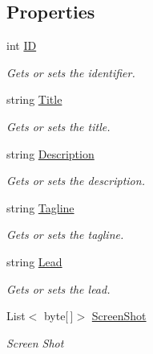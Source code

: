 \subsection*{Properties}
\begin{DoxyCompactItemize}
\item 
int \hyperlink{class_open_1_1_g_i_1_1hypermart_1_1_data_transformation_objects_1_1_product_d_t_o_ab965f0f2be3b04afb1de5e8fa97cd93a}{ID}
\begin{DoxyCompactList}\small\item\em Gets or sets the identifier. \end{DoxyCompactList}\item 
string \hyperlink{class_open_1_1_g_i_1_1hypermart_1_1_data_transformation_objects_1_1_product_d_t_o_a6f03b28697c295061d5c914d5598efef}{Title}
\begin{DoxyCompactList}\small\item\em Gets or sets the title. \end{DoxyCompactList}\item 
string \hyperlink{class_open_1_1_g_i_1_1hypermart_1_1_data_transformation_objects_1_1_product_d_t_o_a1de153f9a50688af8c97932d30056fef}{Description}
\begin{DoxyCompactList}\small\item\em Gets or sets the description. \end{DoxyCompactList}\item 
string \hyperlink{class_open_1_1_g_i_1_1hypermart_1_1_data_transformation_objects_1_1_product_d_t_o_a7b9cf190d3a304a72287dc1c0200aa94}{Tagline}
\begin{DoxyCompactList}\small\item\em Gets or sets the tagline. \end{DoxyCompactList}\item 
string \hyperlink{class_open_1_1_g_i_1_1hypermart_1_1_data_transformation_objects_1_1_product_d_t_o_a900af3a5017cf99ef7a51c8a496289cc}{Lead}
\begin{DoxyCompactList}\small\item\em Gets or sets the lead. \end{DoxyCompactList}\item 
List$<$ byte\mbox{[}$\,$\mbox{]}$>$ \hyperlink{class_open_1_1_g_i_1_1hypermart_1_1_data_transformation_objects_1_1_product_d_t_o_ac2f998445710bc55481fe5983ed485de}{Screen\+Shot}
\begin{DoxyCompactList}\small\item\em Screen Shot \end{DoxyCompactList}\end{DoxyCompactItemize}


